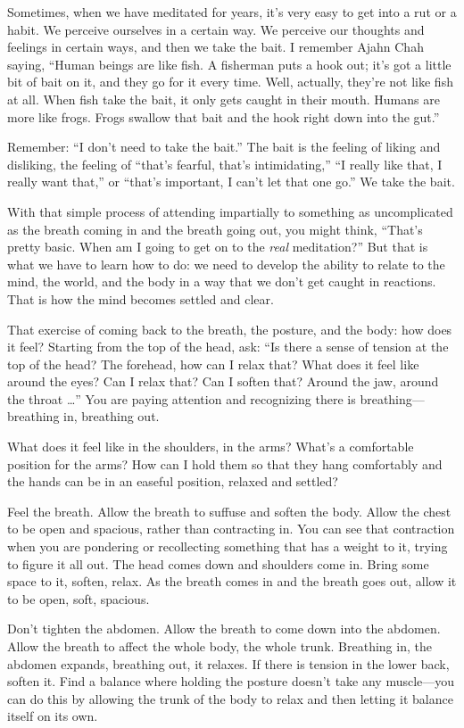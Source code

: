 Sometimes, when we have meditated for years, it’s very easy to get into
a rut or a habit. We perceive ourselves in a certain way. We perceive
our thoughts and feelings in certain ways, and then we take the bait. I
remember Ajahn Chah saying, “Human beings are like fish. A fisherman
puts a hook out; it’s got a little bit of bait on it, and they go for it
every time. Well, actually, they’re not like fish at all. When fish take
the bait, it only gets caught in their mouth. Humans are more like
frogs. Frogs swallow that bait and the hook right down into the gut.”

Remember: “I don’t need to take the bait.” The bait is the feeling of
liking and disliking, the feeling of “that’s fearful, that’s
intimidating,” “I really like that, I really want that,” or “that’s
important, I can’t let that one go.” We take the bait.

With that simple process of attending impartially to something as
uncomplicated as the breath coming in and the breath going out, you
might think, “That’s pretty basic. When am I going to get on to the
\emph{real} meditation?” But that is what we have to learn how to do: we
need to develop the ability to relate to the mind, the world, and the
body in a way that we don’t get caught in reactions. That is how the
mind becomes settled and clear.

That exercise of coming back to the breath, the posture, and the body:
how does it feel? Starting from the top of the head, ask: “Is there a
sense of tension at the top of the head? The forehead, how can I relax
that? What does it feel like around the eyes? Can I relax that? Can I
soften that? Around the jaw, around the throat \ldots{}” You are paying
attention and recognizing there is breathing—breathing in, breathing
out.

What does it feel like in the shoulders, in the arms? What’s a
comfortable position for the arms? How can I hold them so that they hang
comfortably and the hands can be in an easeful position, relaxed and
settled?

Feel the breath. Allow the breath to suffuse and soften the body. Allow
the chest to be open and spacious, rather than contracting in. You can
see that contraction when you are pondering or recollecting something
that has a weight to it, trying to figure it all out. The head comes
down and shoulders come in. Bring some space to it, soften, relax. As
the breath comes in and the breath goes out, allow it to be open, soft,
spacious.

Don’t tighten the abdomen. Allow the breath to come down into the
abdomen. Allow the breath to affect the whole body, the whole trunk.
Breathing in, the abdomen expands, breathing out, it relaxes. If there
is tension in the lower back, soften it. Find a balance where holding
the posture doesn’t take any muscle—you can do this by allowing the
trunk of the body to relax and then letting it balance itself on its
own.

